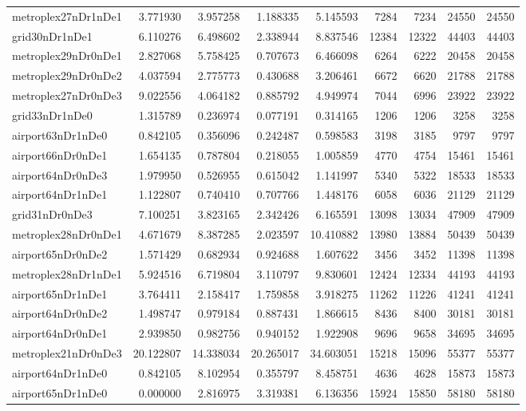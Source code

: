 \begin{longtable}{|l|r|r|r|r|r|r|r|r|}
metroplex27nDr1nDe1 & 3.771930 & 3.957258 & 1.188335 & 5.145593 & 7284 & 7234 & 24550 & 24550 \\
grid30nDr1nDe1 & 6.110276 & 6.498602 & 2.338944 & 8.837546 & 12384 & 12322 & 44403 & 44403 \\
metroplex29nDr0nDe1 & 2.827068 & 5.758425 & 0.707673 & 6.466098 & 6264 & 6222 & 20458 & 20458 \\
metroplex29nDr0nDe2 & 4.037594 & 2.775773 & 0.430688 & 3.206461 & 6672 & 6620 & 21788 & 21788 \\
metroplex27nDr0nDe3 & 9.022556 & 4.064182 & 0.885792 & 4.949974 & 7044 & 6996 & 23922 & 23922 \\
grid33nDr1nDe0 & 1.315789 & 0.236974 & 0.077191 & 0.314165 & 1206 & 1206 & 3258 & 3258 \\
airport63nDr1nDe0 & 0.842105 & 0.356096 & 0.242487 & 0.598583 & 3198 & 3185 & 9797 & 9797 \\
airport66nDr0nDe1 & 1.654135 & 0.787804 & 0.218055 & 1.005859 & 4770 & 4754 & 15461 & 15461 \\
airport64nDr0nDe3 & 1.979950 & 0.526955 & 0.615042 & 1.141997 & 5340 & 5322 & 18533 & 18533 \\
airport64nDr1nDe1 & 1.122807 & 0.740410 & 0.707766 & 1.448176 & 6058 & 6036 & 21129 & 21129 \\
grid31nDr0nDe3 & 7.100251 & 3.823165 & 2.342426 & 6.165591 & 13098 & 13034 & 47909 & 47909 \\
metroplex28nDr0nDe1 & 4.671679 & 8.387285 & 2.023597 & 10.410882 & 13980 & 13884 & 50439 & 50439 \\
airport65nDr0nDe2 & 1.571429 & 0.682934 & 0.924688 & 1.607622 & 3456 & 3452 & 11398 & 11398 \\
metroplex28nDr1nDe1 & 5.924516 & 6.719804 & 3.110797 & 9.830601 & 12424 & 12334 & 44193 & 44193 \\
airport65nDr1nDe1 & 3.764411 & 2.158417 & 1.759858 & 3.918275 & 11262 & 11226 & 41241 & 41241 \\
airport64nDr0nDe2 & 1.498747 & 0.979184 & 0.887431 & 1.866615 & 8436 & 8400 & 30181 & 30181 \\
airport64nDr0nDe1 & 2.939850 & 0.982756 & 0.940152 & 1.922908 & 9696 & 9658 & 34695 & 34695 \\
metroplex21nDr0nDe3 & 20.122807 & 14.338034 & 20.265017 & 34.603051 & 15218 & 15096 & 55377 & 55377 \\
airport64nDr1nDe0 & 0.842105 & 8.102954 & 0.355797 & 8.458751 & 4636 & 4628 & 15873 & 15873 \\
airport65nDr1nDe0 & 0.000000 & 2.816975 & 3.319381 & 6.136356 & 15924 & 15850 & 58180 & 58180 \\

\end{longtable}
